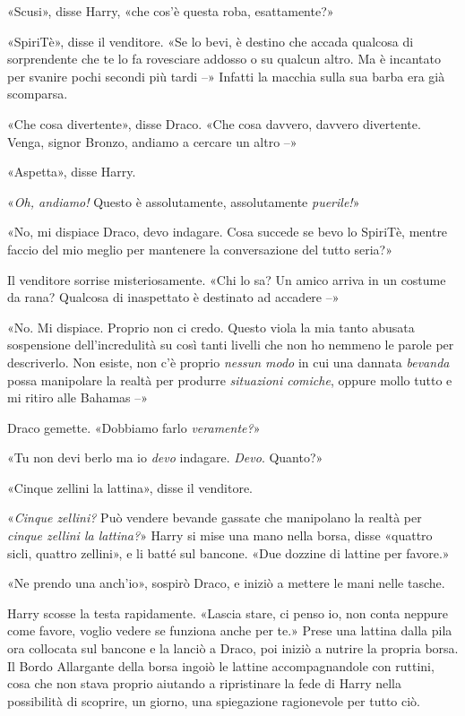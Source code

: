 «Scusi», disse Harry, «che cos’è questa roba, esattamente?»

«SpiriTè», disse il venditore. «Se lo bevi, è destino che accada qualcosa di sorprendente che te lo fa rovesciare addosso o su qualcun altro. Ma è incantato per svanire pochi secondi più tardi –» Infatti la macchia sulla sua barba era già scomparsa.

«Che cosa divertente», disse Draco. «Che cosa davvero, davvero divertente. Venga, signor Bronzo, andiamo a cercare un altro –»

«Aspetta», disse Harry.

«\textit{Oh, andiamo!} Questo è assolutamente, assolutamente \textit{puerile!}»

«No, mi dispiace Draco, devo indagare. Cosa succede se bevo lo SpiriTè, mentre faccio del mio meglio per mantenere la conversazione del tutto seria?»

Il venditore sorrise misteriosamente. «Chi lo sa? Un amico arriva in un costume da rana? Qualcosa di inaspettato è destinato ad accadere –»

«No. Mi dispiace. Proprio non ci credo. Questo viola la mia tanto abusata sospensione dell’incredulità su così tanti livelli che non ho nemmeno le parole per descriverlo. Non esiste, non c’è proprio \textit{nessun modo} in cui una dannata \textit{bevanda} possa manipolare la realtà per produrre \textit{situazioni comiche}, oppure mollo tutto e mi ritiro alle Bahamas –»

Draco gemette. «Dobbiamo farlo \textit{veramente?}»

«Tu non devi berlo ma io \textit{devo} indagare. \textit{Devo}. Quanto?»

«Cinque zellini la lattina», disse il venditore.

«\textit{Cinque zellini?} Può vendere bevande gassate che manipolano la realtà per \textit{cinque zellini la lattina?}» Harry si mise una mano nella borsa, disse «quattro sicli, quattro zellini», e li batté sul bancone. «Due dozzine di lattine per favore.»

«Ne prendo una anch’io», sospirò Draco, e iniziò a mettere le mani nelle tasche.

Harry scosse la testa rapidamente. «Lascia stare, ci penso io, non conta neppure come favore, voglio vedere se funziona anche per te.» Prese una lattina dalla pila ora collocata sul bancone e la lanciò a Draco, poi iniziò a nutrire la propria borsa. Il Bordo Allargante della borsa ingoiò le lattine accompagnandole con ruttini, cosa che non stava proprio aiutando a ripristinare la fede di Harry nella possibilità di scoprire, un giorno, una spiegazione ragionevole per tutto ciò.

